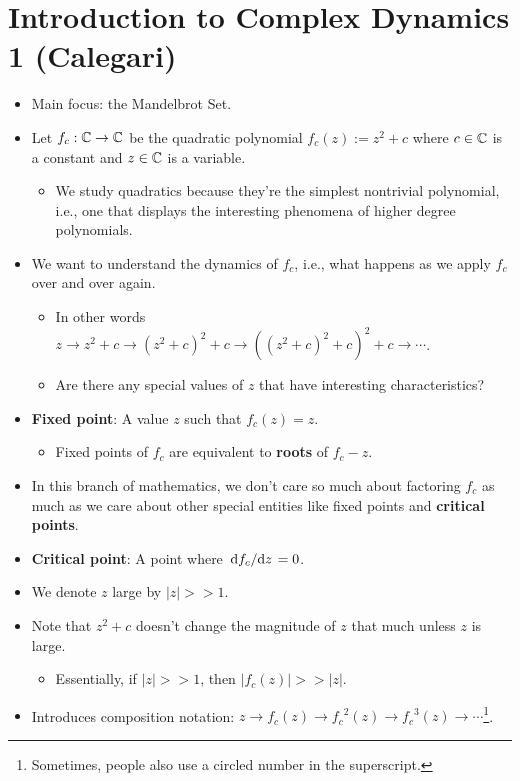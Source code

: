 \documentclass[../apprentice.tex]{subfiles}
\begin{document}
\section{Introduction to Complex Dynamics 1 (Calegari)}
\begin{itemize}
    \item Main focus: the Mandelbrot Set.
    \item Let $f_c:\mathbb{C}\to\mathbb{C}$ be the quadratic polynomial $f_c(z):=z^2+c$ where $c\in\mathbb{C}$ is a constant and $z\in\mathbb{C}$ is a variable.
    \begin{itemize}
        \item We study quadratics because they're the simplest nontrivial polynomial, i.e., one that displays the interesting phenomena of higher degree polynomials.
    \end{itemize}
    \item We want to understand the dynamics of $f_c$, i.e., what happens as we apply $f_c$ over and over again.
    \begin{itemize}
        \item In other words $z\to z^2+c\to (z^2+c)^2+c\to ((z^2+c)^2+c)^2+c\to\cdots$.
        \item Are there any special values of $z$ that have interesting characteristics?
    \end{itemize}
    \item \textbf{Fixed point}: A value $z$ such that $f_c(z)=z$.
    \begin{itemize}
        \item Fixed points of $f_c$ are equivalent to \textbf{roots} of $f_c-z$.
    \end{itemize}
    \item In this branch of mathematics, we don't care so much about factoring $f_c$ as much as we care about other special entities like fixed points and \textbf{critical points}.
    \item \textbf{Critical point}: A point where $\dv*{f_c}{z}=0$.
    \item We denote $z$ large by $|z|>>1$.
    \item Note that $z^2+c$ doesn't change the magnitude of $z$ that much unless $z$ is large.
    \begin{itemize}
        \item Essentially, if $|z|>>1$, then $|f_c(z)|>>|z|$.
    \end{itemize}
    \item Introduces composition notation: $z\to f_c(z)\to {f_c}^2(z)\to {f_c}^3(z)\to\cdots$\footnote{Sometimes, people also use a circled number in the superscript.}.

\end{itemize}
\end{document}
